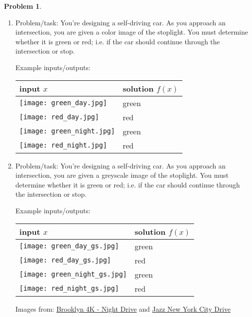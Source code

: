 \documentclass[12pt]{article}
\theoremstyle{definition}
\newtheorem{problem}{Problem}
\begin{document}
\begin{problem}
\begin{enumerate}
\clearpage


        \item Problem/task: You're designing a self-driving car. 
            As you approach an intersection, you are given a color image of the stoplight. 
            You must determine whether it is green or red; i.e. if the car should continue through the intersection or stop.
            
            Example inputs/outputs:

            \begin{center}
            \begin{tabular}{>{\centering\arraybackslash}m{2in}>{\centering\arraybackslash}m{2in}}
            \toprule
                input $x$ & solution $f(x)$ \\ \midrule
            \texttt{[image: green\_day.jpg]} & green \\
            \texttt{[image: red\_day.jpg]} & red \\
            \texttt{[image: green\_night.jpg]} & green \\
            \texttt{[image: red\_night.jpg]} & red \\
                \bottomrule
            \end{tabular}
            \end{center}

            \clearpage
        \item Problem/task: You're designing a self-driving car. 
            As you approach an intersection, you are given a greyscale image of the stoplight. 
            You must determine whether it is green or red; i.e. if the car should continue through the intersection or stop.
        
            Example inputs/outputs:

            \begin{center}
            \begin{tabular}{>{\centering\arraybackslash}m{2in}>{\centering\arraybackslash}m{2in}}
            \toprule
                input $x$ & solution $f(x)$ \\ \midrule
            \texttt{[image: green\_day\_gs.jpg]} & green \\
            \texttt{[image: red\_day\_gs.jpg]} & red \\
            \texttt{[image: green\_night\_gs.jpg]} & green \\
            \texttt{[image: red\_night\_gs.jpg]} & red \\
                \bottomrule
            \end{tabular}
            \end{center}

            Images from:
            \href{https://www.youtube.com/watch?v=yhCAWZlv_Sc}{Brooklyn 4K - Night Drive}
            and \href{https://www.youtube.com/watch?v=eyu0d1x5TMs}{Jazz New York City Drive}

    \end{enumerate}
\end{problem}
\clearpage
\end{document}
